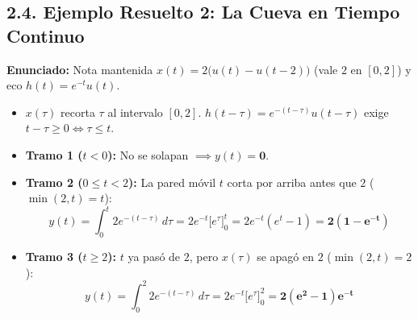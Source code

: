 \documentclass[10pt,a4paper]{article}
\begin{document}
	\subsection*{2.4. Ejemplo Resuelto 2: La Cueva en Tiempo Continuo}
	\textbf{Enunciado:} Nota mantenida $x(t) = 2\big(u(t) - u(t-2)\big)$ (vale $2$ en $[0,2]$) y eco $h(t) = e^{-t}u(t)$.
	\begin{itemize}
		\item $x(\tau)$ recorta $\tau$ al intervalo $[0, 2]$. $h(t-\tau) = e^{-(t-\tau)}u(t-\tau)$ exige $t-\tau \ge 0 \iff \tau \le t$.
		\item \textbf{Tramo 1 ($t < 0$):} No se solapan $\implies y(t) = \mathbf{0}$.
		\item \textbf{Tramo 2 ($0 \le t < 2$):} La pared móvil $t$ corta por arriba antes que $2$ ($\min(2,t)=t$):
		$$y(t) = \int_{0}^{t} 2e^{-(t-\tau)}\,d\tau = 2e^{-t}\Big[e^{\tau}\Big]_{0}^{t} = 2e^{-t}(e^t - 1) = \mathbf{2(1 - e^{-t})}$$
		\item \textbf{Tramo 3 ($t \ge 2$):} $t$ ya pasó de $2$, pero $x(\tau)$ se apagó en $2$ ($\min(2,t)=2$):
		$$y(t) = \int_{0}^{2} 2e^{-(t-\tau)}\,d\tau = 2e^{-t}\Big[e^{\tau}\Big]_{0}^{2} = \mathbf{2(e^2 - 1)e^{-t}}$$
	\end{itemize}
\end{document}
